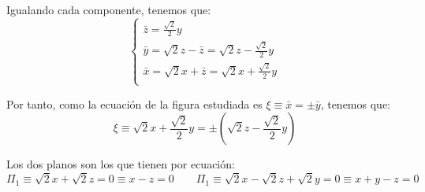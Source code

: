 \begin{ejercicio}
    Igualando cada componente, tenemos que:
    \begin{equation*}
        \left\{\begin{array}{l}
            \bar{z} = \frac{\sqrt{2}}{2}y \\
            \bar{y} = \sqrt{2}z - \bar{z} = \sqrt{2}z - \frac{\sqrt{2}}{2}y \\
            \bar{x} = \sqrt{2}x + \bar{z} = \sqrt{2}x + \frac{\sqrt{2}}{2}y \\
        \end{array}\right.
    \end{equation*}

    Por tanto, como la ecuación de la figura estudiada es $\xi \equiv \bar{x}=\pm \bar{y}$, tenemos que:
    \begin{equation*}
        \xi \equiv \sqrt{2}x + \frac{\sqrt{2}}{2}y = \pm \left(\sqrt{2}z - \frac{\sqrt{2}}{2}y\right)
    \end{equation*}

    Los dos planos son los que tienen por ecuación:
    \begin{equation*}
        \Pi_1 \equiv \sqrt{2}x +\sqrt{2}z=0 \equiv x-z=0
        \qquad
        \Pi_1 \equiv \sqrt{2}x -\sqrt{2}z + \sqrt{2}y=0 \equiv x+y-z=0
    \end{equation*}
\end{ejercicio}



